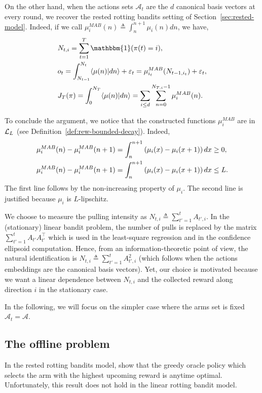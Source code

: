 On the other hand, when the actions sets $\mathcal{A}_t$ are the $d$ canonical basis vectors at every round, we recover the rested rotting bandits setting of Section~\ref{sec:rested-model}. Indeed, if we call $\mu_i^{MAB}(n) \triangleq \int_{n}^{n+1} \mu_i(n) dn$, we have,
\begin{align*}
&N_{t,i} = \sum_{t=1}^T \mathbbm{1}(\pi(t) = i),\\
&o_t =  \int_{N_{t-1}}^{N_{t}} \langle \mu(n) |   dn \rangle  + \noise_t = \mu_{i_t}^{MAB}(N_{t-1, i_t}) + \noise_t,\\
& J_T(\pi) = \int_{0}^{N_{T}} \langle \mu(n) |  dn \rangle = \sum_{i\leq d} \sum_{n=0}^{N_{T, i}-1} \mu_{i}^{MAB}(n).
\end{align*}

To conclude the argument, we notice that the constructed functions $\mu_i^{MAB}$ are in $\mathcal{L}_L$ (see Definition~\ref{def:rew-bounded-decay}). Indeed, 
\begin{align*}
&\mu_i^{MAB}(n) -\mu_i^{MAB}(n+1) = \int_{n}^{n+1} \left(\mu_i(x) - \mu_i(x+1)\right) dx \geq 0,\\
&\mu_i^{MAB}(n) -\mu_i^{MAB}(n+1) = \int_{n}^{n+1} \left(\mu_i(x) - \mu_i(x+1)\right) dx \leq L.
\end{align*}
The first line follows by the non-increasing property of $\mu_i$. The second line is justified because $\mu_i$ is $L$-lipschitz.
 
\begin{remark}
We choose to measure the pulling intensity as $N_{t,i} \triangleq \sum_{t'=1}^t A_{t',i}$. In the (stationary) linear bandit problem, the number of pulls is replaced by the matrix $\sum_{t'=1}^t A_{t'}A_{t'}^\intercal$ which is used in the least-square regression and in the confidence ellipsoid computation. Hence, from an information-theoretic point of view, the natural identification is $N_{t,i} \triangleq \sum_{t'=1}^t A_{t',i}^2 $  (which follows when the actions embeddings are the canonical basis vectors). Yet, our choice is motivated because we want a linear dependence between  $N_{t,i}$ and the collected reward along direction $i$ in the stationary case.
\end{remark}

In the following, we will focus on the simpler case where the arms set is fixed $\mathcal{A}_t = \mathcal{A}$. 

\subsection{The offline problem}
\label{ss:linear-rotting-offline}
In the rested rotting bandits model, \citet{heidari2016tight} show that the greedy oracle policy which selects the arm with the highest upcoming reward is anytime optimal. Unfortunately, this result does not hold in the linear rotting bandit model. 

